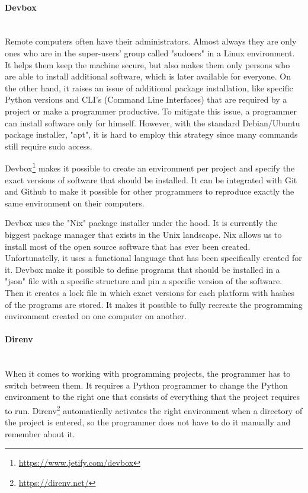 \paragraph{Devbox}\mbox{}\\
\indent Remote computers often have their administrators. Almost always they are only ones who are in the super-users' group called "sudoers" in a Linux environment. It helps them keep the machine secure, but also makes them only persons who are able to install additional software, which is later available for everyone. On the other hand, it raises an issue of additional package installation, like specific Python versions and CLI's (Command Line Interfaces) that are required by a project or make a programmer productive.  
To mitigate this issue, a programmer can install software only for himself. However, with the standard Debian/Ubuntu package installer, "apt", it is hard to employ this strategy since many commands still require sudo access. 

Devbox\footnote{\url{https://www.jetify.com/devbox}} makes it possible to create an environment per project and specify the exact versions of software that should be installed. It can be integrated with Git and Github to make it possible for other programmers to reproduce exactly the same environment on their computers. 

Devbox uses the "Nix" package installer under the hood. It is currently the biggest package manager that exists in the Unix landscape. Nix allows us to install most of the open source software that has ever been created. Unfortunatelly, it uses a functional language that has been specifically created for it. Devbox make it possible to define programs that should be installed in a "json" file with a specific structure and pin a specific version of the software. Then it creates a lock file in which exact versions for each platform with hashes of the programs are stored. It makes it possible to fully recreate the programming environment created on one computer on another.
 

\paragraph{Direnv}\mbox{}\\
\indent When it comes to working with programming projects, the programmer has to switch between them. It requires a Python programmer to change the Python environment to the right one that consists of everything that the project requires to run. Direnv\footnote{\url{https://direnv.net/}} automatically activates the right environment when a directory of the project is entered, so the programmer does not have to do it manually and remember about it.

